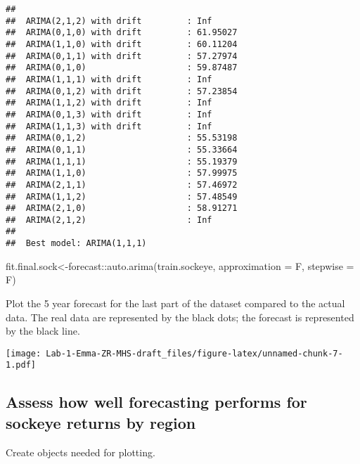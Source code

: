 \documentclass[
]{article}
\newenvironment{Shaded}{\begin{snugshade}}{\end{snugshade}}
\newcommand{\AttributeTok}[1]{\textcolor[rgb]{0.77,0.63,0.00}{#1}}
\newcommand{\FunctionTok}[1]{\textcolor[rgb]{0.00,0.00,0.00}{#1}}
\newcommand{\NormalTok}[1]{#1}
\newcommand{\OtherTok}[1]{\textcolor[rgb]{0.56,0.35,0.01}{#1}}
\newcommand{\SpecialCharTok}[1]{\textcolor[rgb]{0.00,0.00,0.00}{#1}}
\begin{document}
\begin{verbatim}
## 
##  ARIMA(2,1,2) with drift         : Inf
##  ARIMA(0,1,0) with drift         : 61.95027
##  ARIMA(1,1,0) with drift         : 60.11204
##  ARIMA(0,1,1) with drift         : 57.27974
##  ARIMA(0,1,0)                    : 59.87487
##  ARIMA(1,1,1) with drift         : Inf
##  ARIMA(0,1,2) with drift         : 57.23854
##  ARIMA(1,1,2) with drift         : Inf
##  ARIMA(0,1,3) with drift         : Inf
##  ARIMA(1,1,3) with drift         : Inf
##  ARIMA(0,1,2)                    : 55.53198
##  ARIMA(0,1,1)                    : 55.33664
##  ARIMA(1,1,1)                    : 55.19379
##  ARIMA(1,1,0)                    : 57.99975
##  ARIMA(2,1,1)                    : 57.46972
##  ARIMA(1,1,2)                    : 57.48549
##  ARIMA(2,1,0)                    : 58.91271
##  ARIMA(2,1,2)                    : Inf
## 
##  Best model: ARIMA(1,1,1)
\end{verbatim}

\begin{Shaded}
\begin{Highlighting}[]
\NormalTok{fit.final.sock}\OtherTok{\textless{}{-}}\NormalTok{forecast}\SpecialCharTok{::}\FunctionTok{auto.arima}\NormalTok{(train.sockeye, }\AttributeTok{approximation =}\NormalTok{ F, }\AttributeTok{stepwise =}\NormalTok{ F)}
\end{Highlighting}
\end{Shaded}

Plot the 5 year forecast for the last part of the dataset compared to
the actual data. The real data are represented by the black dots; the
forecast is represented by the black line.

\texttt{[image: Lab-1-Emma-ZR-MHS-draft\_files/figure-latex/unnamed-chunk-7-1.pdf]}

\hypertarget{assess-how-well-forecasting-performs-for-sockeye-returns-by-region}{%
\subsection{Assess how well forecasting performs for sockeye returns by
region}\label{assess-how-well-forecasting-performs-for-sockeye-returns-by-region}}

Create objects needed for plotting.
\end{document}
